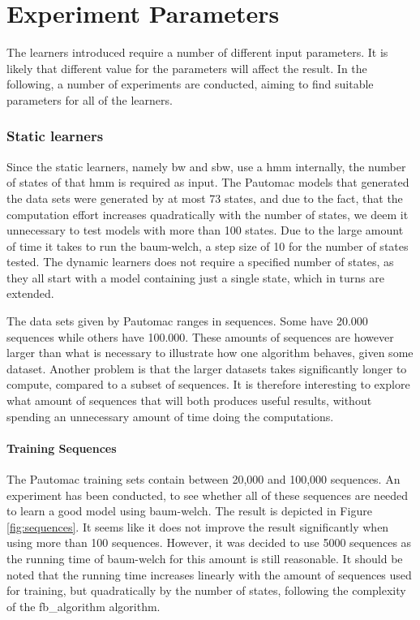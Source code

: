 \section{Experiment Parameters}\label{sec:parameters}
The learners introduced require a number of different input parameters. It is likely that different value for the parameters will affect the result. In the following, a number of experiments are conducted, aiming to find suitable parameters for all of the learners. 

\subsubsection{Static learners}
Since the static learners, namely \gls{bw} and \gls{sbw}, use a \gls{hmm} internally, the number of states of that \gls{hmm} is required as input.
The Pautomac models that generated the data sets were generated by at most 73 states, and due to the fact, that the computation effort increases quadratically with the number of states, we deem it unnecessary to test models with more than 100 states. Due to the large amount of time it takes to run the \gls{baum-welch}, a step size of 10 for the number of states tested.
The dynamic learners does not require a specified number of states, as they all start with a model containing just a single state, which in turns are extended.

The data sets given by Pautomac ranges in sequences. Some have 20.000 sequences while others have 100.000. These amounts of sequences are however larger than what is necessary to illustrate how one algorithm behaves, given some dataset. Another problem is that the larger datasets takes significantly longer to compute, compared to a subset of sequences. It is therefore interesting to explore what amount of sequences that will both produces useful results, without spending an unnecessary amount of time doing the computations.

\paragraph{Training Sequences}
The Pautomac training sets contain between 20,000 and 100,000 sequences.
An experiment has been conducted, to see whether all of these sequences are needed to learn a good model using \gls{baum-welch}.
The result is depicted in Figure \ref{fig:sequences}. It seems like it does not improve the result significantly when using more than 100 sequences.
However, it was decided to use 5000 sequences as the running time of \gls{baum-welch} for this amount is still reasonable. It should be noted that the running time increases linearly with the amount of sequences used for training, but quadratically by the number of states, following the complexity of the \gls{fb_algorithm} algorithm.

